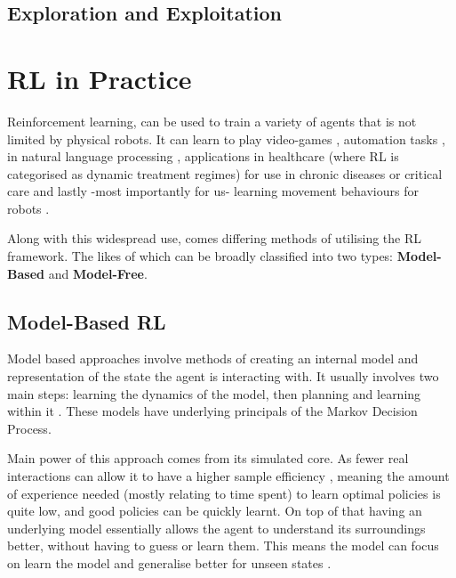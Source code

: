 
    \subsection{Exploration and Exploitation}

\section{RL in Practice}
  Reinforcement learning, can be used to train a variety of agents that is not limited by physical robots. It can learn to play video-games \cite{comi2018} , automation tasks \cite{}, in natural language processing \cite{paulus2017deepreinforcedmodelabstractive}, applications  in healthcare (where RL is categorised as dynamic treatment regimes) for use in chronic diseases or critical care \cite{yu2020reinforcementlearninghealthcaresurvey} and lastly -most importantly for us- learning movement behaviours for robots \cite{}.
  
  Along with this widespread use, comes differing methods of utilising the RL framework. The likes of which can be broadly classified into two types: \textbf{Model-Based} and \textbf{Model-Free}.
  
  \subsection{Model-Based RL}
  Model based approaches involve methods of creating an internal model and representation of the state the agent is interacting with. It usually involves two main steps: learning the dynamics of the model, then planning and learning within it \cite{MAL-086}. These models have underlying principals of the Markov Decision Process.

  Main power of this approach comes from its simulated core. As fewer real interactions can allow it to have a higher sample efficiency \cite{liu2021DRLminireview,wu23robotLearn}, meaning the amount of experience needed (mostly relating to time spent) to learn optimal policies is quite low, and good policies can be quickly learnt.
  On top of that having an underlying model essentially allows the agent to understand its surroundings better, without having to guess or learn them. This means the model can focus on learn the model and generalise better for unseen states \cite{MAL-086}.
  
